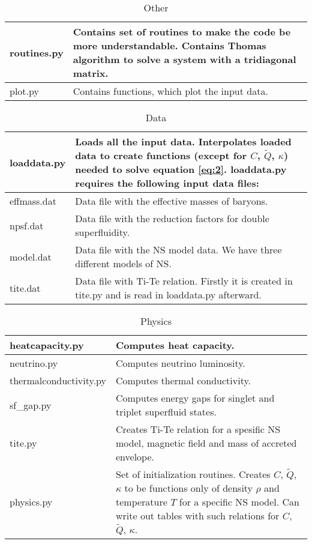 \documentclass[preprint,pre,floats,aps,amsmath,amssymb]{revtex4}
\begin{document}
\begin{table} [p]
\caption{Other}
\begin{center}
\begin{tabular}{|  p{3.8cm} | p{13cm} |}
  \hline
   routines.py   & Contains set of routines to make the code be more understandable. Contains Thomas algorithm to solve a system with a tridiagonal matrix.\\ \hline
   plot.py  & Contains functions, which plot the input data. \\    \hline
   \end{tabular}
\end{center}
\label{tab:4}
\end{table}
\newpage
\begin{table} [p]
\caption{ Data}
\begin{center}
\begin{tabular}{|  p{3.8cm} | p{13cm} |}
  \hline
   loaddata.py   & Loads all the input data. Interpolates loaded data to create functions (except for $C$, $\tilde{Q}$, $\kappa$) needed to solve equation \ref{eq:2}.  loaddata.py requires the following input data files: \\ \hline
   effmass.dat  & Data file with the effective masses of baryons. \\ \hline
   npsf.dat & Data file with the reduction factors for double superfluidity.  \\ \hline
   model.dat & Data file with the NS model data. We have three different models of NS.   \\ \hline
   tite.dat & Data file with Ti-Te relation. Firstly it is created in tite.py and is read in loaddata.py afterward.  \\ \hline
   \end{tabular}
\end{center}
\label{tab:5}
\end{table}
\begin{table} [p]
\caption{Physics}
\begin{center}
\begin{tabular}{|  p{3.8cm} | p{13cm} |}
  \hline
   heatcapacity.py   & Computes heat capacity. \\ \hline
   neutrino.py  & Computes neutrino luminosity.\\ \hline
   thermalconductivity.py  & Computes thermal conductivity. \\ \hline
    sf\_gap.py & Computes energy gaps for singlet and triplet superfluid states.  \\ \hline
   tite.py & Creates Ti-Te relation for a spesific NS model, magnetic field and mass of accreted envelope. \\ \hline
   physics.py & Set of initialization routines. Creates $C$, $\tilde{Q}$, $\kappa$ to be functions only of density $\rho$ and temperature $T$ for a specific NS model. Can write out tables with such relations for $C$, $\tilde{Q}$, $\kappa$. \\ \hline
   \end{tabular}
\end{center}
\label{tab:6}
\end{table}
\newpage
\end{document}

